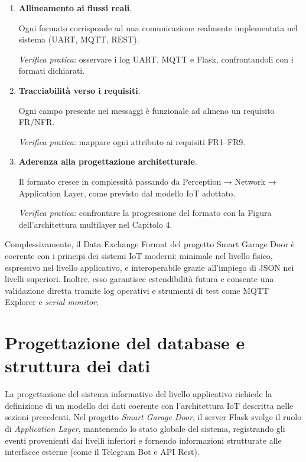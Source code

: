 \begin{enumerate}


   \item
\textbf{Allineamento
ai flussi reali}.

          Ogni formato corrisponde ad una
comunicazione realmente implementata nel sistema (UART, MQTT, REST).


         \textit{Verifica
pratica:} osservare i log UART, MQTT e Flask, confrontandoli con i
formati dichiarati.

    \item
\textbf{Tracciabilità
verso i requisiti}.

          Ogni campo presente nei messaggi è
funzionale ad almeno un requisito FR/NFR.


\textit{Verifica
pratica:} mappare ogni attributo ai requisiti FR1–FR9.


\item
\textbf{Aderenza
alla progettazione architetturale}.

          Il formato cresce
in complessità passando da Perception → Network → Application
Layer, come previsto dal modello IoT adottato.


\textit{Verifica
pratica:} confrontare la progressione del formato con la Figura
dell’architettura multilayer nel Capitolo
4.

\end{enumerate}



Complessivamente,
il Data Exchange Format del progetto Smart Garage Door è coerente
con i principi dei sistemi IoT moderni: minimale nel livello fisico,
espressivo nel livello applicativo, e interoperabile grazie
all’impiego di JSON nei livelli superiori. Inoltre, esso garantisce
estendibilità futura e consente una validazione diretta tramite log
operativi e strumenti di test come MQTT Explorer e \textit{serial
monitor}.






\section{Progettazione del database e struttura dei dati}

La progettazione del sistema informativo del livello applicativo richiede la definizione
di un modello dei dati coerente con l'architettura IoT descritta nelle sezioni precedenti.
Nel progetto \textit{Smart Garage Door}, il server Flask svolge il ruolo di
\textit{Application Layer}, mantenendo lo stato globale del sistema, registrando gli eventi
provenienti dai livelli inferiori e fornendo informazioni strutturate alle
interfacce esterne (come il Telegram Bot e API Rest).


